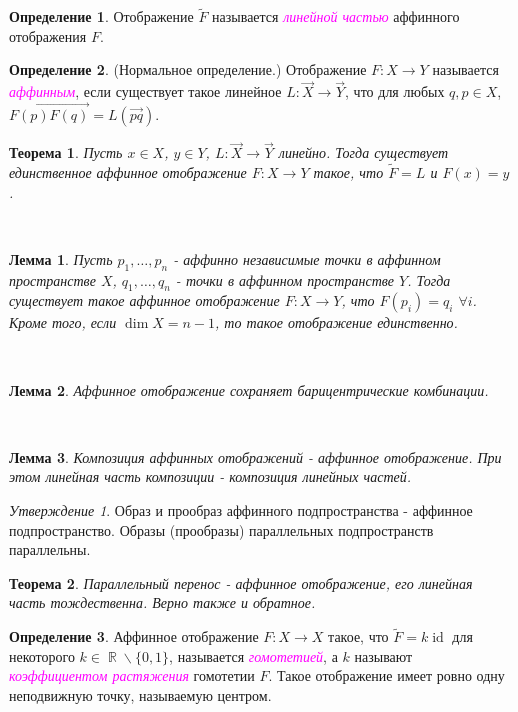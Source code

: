 \documentclass[a4paper,100pt]{article}
\theoremstyle{indented}
\newtheorem{theorem}{Теорема}
\newtheorem{lemma}{Лемма}
\theoremstyle{definition}
\newtheorem{defn}{Определение}
\theoremstyle{remark}
\newtheorem{stat}{Утверждение}
\DeclareMathOperator{\ra}{\rightarrow}
\DeclareMathOperator{\id}{id}
\DeclareMathOperator{\RR}{\mathbb{R}}
\begin{document}
\begin{defn}
    Отображение $\tilde{F}$ называется \textit{\textcolor{magenta}{\hypertarget{s27}{линейной частью}}} аффинного отображения $F$.
\end{defn}

\begin{defn}
    (Нормальное определение.) Отображение $F:X\ra Y$ называется \textit{\textcolor{magenta}{\hypertarget{s28}{аффинным}}}, если существует такое линейное $L:\vec{X}\ra\vec{Y}$, что для любых $q, p\in X$, $\overrightarrow{F(p)F(q)}=L(\vec{pq})$. 
\end{defn}

\begin{theorem}
    Пусть $x\in X$, $y\in Y$, $L:\vec{X}\ra \vec{Y}$ линейно. Тогда существует единственное аффинное отображение $F:X\ra Y$ такое, что $\tilde{F}=L$ и $F(x)=y$. 
\end{theorem} \

\begin{lemma}
    Пусть $p_1, \ldots, p_n$ - аффинно независимые точки в аффинном пространстве $X$, $q_1, \ldots, q_n$ - точки в аффинном пространстве $Y$. Тогда существует такое аффинное отображение $F:X\ra Y$, что $F(p_i)=q_i$ $\forall i$. Кроме того, если $\dim X = n-1$, то такое отображение единственно.
\end{lemma} \ 

\begin{lemma}
    Аффинное отображение сохраняет барицентрические комбинации.
\end{lemma} \ 

\begin{lemma}
    Композиция аффинных отображений - аффинное отображение. При этом линейная часть композиции - композиция линейных частей.
\end{lemma}

\begin{stat}
    Образ и прообраз аффинного подпространства - аффинное подпространство. Образы (прообразы) параллельных подпространств параллельны.
\end{stat}

\begin{theorem}
    Параллельный перенос - аффинное отображение, его линейная часть тождественна. Верно также и обратное.
\end{theorem}

\begin{defn}
    Аффинное отображение $F:X\ra X$ такое, что $\tilde{F}=k \id$ для некоторого $k \in \RR\backslash \{0, 1\}$, называется \textit{\textcolor{magenta}{\hypertarget{s29}{гомотетией}}}, а $k$ называют \textit{\textcolor{magenta}{\hypertarget{s30}{коэффициентом растяжения}}} гомотетии $F$. Такое отображение имеет ровно одну неподвижную точку, называемую центром.
\end{defn}
\end{document}
